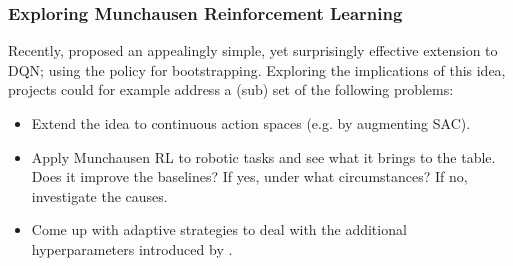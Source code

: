 \documentclass[a4paper]{article}
\begin{document}

\subsubsection{Exploring Munchausen Reinforcement Learning}
Recently, \cite{vieillard2020munchausen} proposed an appealingly simple, yet surprisingly effective extension to DQN; using the policy for bootstrapping. Exploring the implications of this idea, projects could for example address a (sub) set of the following problems:

\begin{itemize}
  \item Extend the idea to continuous action spaces (e.g. by augmenting SAC).
  \item Apply Munchausen RL to robotic tasks and see what it brings to the table. Does it improve the baselines? If yes, under what circumstances? If no, investigate the causes.
  \item Come up with adaptive strategies to deal with the additional hyperparameters introduced by \cite{vieillard2020munchausen}.
\end{itemize}
\end{document}
